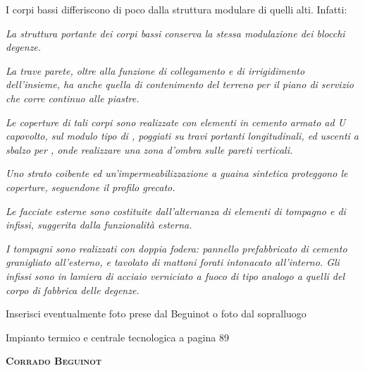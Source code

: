 \noindent I corpi bassi differiscono di poco dalla struttura modulare di quelli alti. Infatti:
\begin{quoting}
	\emph{La struttura portante dei corpi bassi conserva la stessa modulazione dei blocchi degenze.}

\sdots

	\emph{La trave parete, oltre alla funzione di collegamento e di irrigidimento dell'insieme, ha anche quella di contenimento del terreno per il piano di servizio che corre continuo alle piastre.}
	
	\emph{Le coperture di tali corpi sono realizzate con elementi in cemento armato ad U capovolto, sul modulo tipo di , poggiati su travi portanti longitudinali, ed uscenti a sbalzo per , onde realizzare una zona d'ombra sulle pareti verticali.}

\sdots

	\emph{Uno strato coibente ed un'impermeabilizzazione a guaina sintetica proteggono le coperture, seguendone il profilo grecato.}

\sdots

	\emph{Le facciate esterne sono costituite dall'alternanza di elementi di tompagno e di infissi, suggerita dalla funzionalità esterna.}
	
	\emph{I tompagni sono realizzati con doppia fodera: pannello prefabbricato di cemento granigliato all'esterno, e tavolato di mattoni forati intonacato all'interno. Gli infissi sono in lamiera di acciaio verniciato a fuoco di tipo analogo a quelli del corpo di fabbrica delle degenze.}
\end{quoting}

Inserisci eventualmente foto prese dal Beguinot o foto dal sopralluogo

Impianto termico e centrale tecnologica a pagina 89


\vspace{1em}
\begin{flushright}
	\textbf{\textsc{Corrado Beguinot}}
\end{flushright}